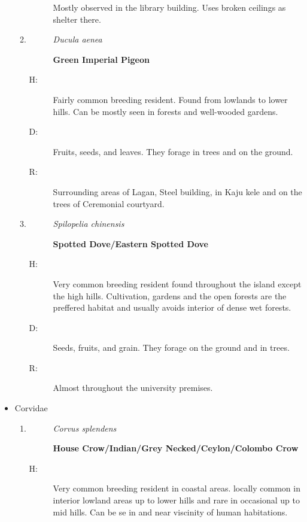 \begin{itemize}
\begin{enumerate}
\begin{description}
Mostly observed in the library building. Uses broken ceilings as shelter there.%
\end{description}%
\item%
\begin{description}%
\item[]%
\textit{Ducula aenea}%
\item[]%
\textbf{Green Imperial Pigeon}%
\end{description}%
\begin{description}%
\item[H: ]%
Fairly common breeding resident. Found from lowlands to lower hills. Can be mostly seen in forests and well{-}wooded gardens.%
\item[D: ]%
Fruits, seeds, and leaves. They forage in trees and on the ground.%
\item[R: ]%
Surrounding areas of Lagan, Steel building, in Kaju kele and on the trees of Ceremonial courtyard.%
\end{description}%
\item%
\begin{description}%
\item[]%
\textit{Spilopelia chinensis}%
\item[]%
\textbf{Spotted Dove/Eastern Spotted Dove}%
\end{description}%
\begin{description}%
\item[H: ]%
Very common breeding resident found throughout the island except the high hills. Cultivation, gardens and the open forests are the preffered habitat and usually avoids interior of dense wet forests.%
\item[D: ]%
Seeds, fruits, and grain. They forage on the ground and in trees.%
\item[R: ]%
Almost throughout the university premises.%
\end{description}%
\end{enumerate}%
\item%
Corvidae%
\begin{enumerate}%
\item%
\begin{description}%
\item[]%
\textit{Corvus splendens}%
\item[]%
\textbf{House Crow/Indian/Grey Necked/Ceylon/Colombo Crow}%
\end{description}%
\begin{description}%
\item[H: ]%
Very common breeding resident in coastal areas. locally common in interior lowland areas up to lower hills and rare in occasional up to mid hills. Can be se in and near viscinity of human habitations.%

\end{description}
\end{enumerate}
\end{itemize}
